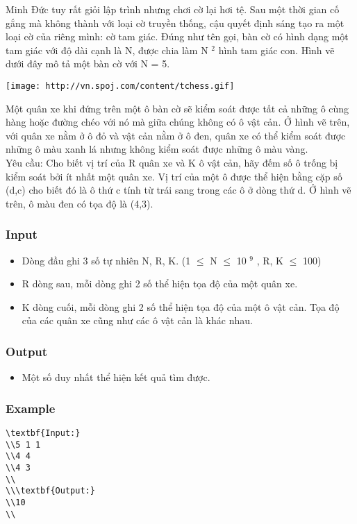 



   Minh Đức tuy rất giỏi lập trình nhưng chơi cờ lại hơi tệ. Sau một thời gian cố gắng mà không thành với loại cờ truyền thống, cậu quyết định sáng tạo ra một loại cờ của riêng mình: cờ tam giác. Đúng như tên gọi, bàn cờ có hình dạng một tam giác với độ dài cạnh là N, được chia làm N   $^    2   $   hình tam giác con. Hình vẽ dưới đây mô tả một bàn cờ với N = 5.  


\texttt{[image: http://vn.spoj.com/content/tchess.gif]}

   Một quân xe khi đứng trên một ô bàn cờ sẽ kiểm soát được tất cả những ô cùng hàng hoặc đường chéo với nó mà giữa chúng không có ô vật cản. Ở hình vẽ trên, với quân xe nằm ở ô đỏ và vật cản nằm ở ô đen, quân xe có thể kiểm soát được những ô màu xanh lá nhưng không kiểm soát được những ô màu vàng.   
\\   Yêu cầu: Cho biết vị trí của R quân xe và K ô vật cản, hãy đếm số ô trống bị kiểm soát bởi ít nhất một quân xe. Vị trí của một ô được thể hiện bằng cặp số (d,c) cho biết đó là ô thứ c tính từ trái sang trong các ô ở dòng thứ d. Ở hình vẽ trên, ô màu đen có tọa độ là (4,3).  

\subsubsection{   Input  }
\begin{itemize}
	\item     Dòng đầu ghi 3 số tự nhiên N, R, K. (1  $\le$  N  $\le$  10    $^     9    $    , R, K  $\le$  100)   
	\item     R dòng sau, mỗi dòng ghi 2 số thể hiện tọa độ của một quân xe.   
	\item     K dòng cuối, mỗi dòng ghi 2 số thể hiện tọa độ của một ô vật cản. Tọa độ của các quân xe cũng như các ô vật cản là khác nhau.   
\end{itemize}

\subsubsection{   Output  }
\begin{itemize}
	\item     Một số duy nhất thể hiện kết quả tìm được.   
\end{itemize}

\subsubsection{   Example  }
\begin{verbatim}
\textbf{Input:}
\\5 1 1
\\4 4
\\4 3
\\
\\\textbf{Output:}
\\10
\\\end{verbatim}
